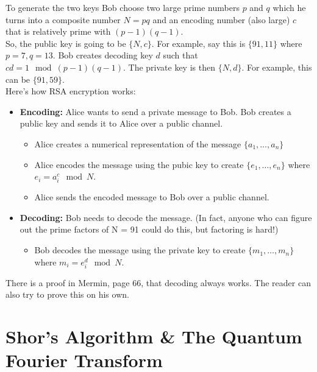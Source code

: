 \documentclass{book}
\theoremstyle{definition}
\begin{document}
To generate the two keys Bob choose two large prime numbers $p$
and $q$ which he turns into a composite number $N = pq$ and an
encoding number (also large) $c$ that is relatively prime with
$(p-1)(q-1)$. \\

So, the public key is going to be $\{ N,c\}$. For example, say this is $\{91,11\}$ where $p=7, q=13$. Bob creates  decoding key $d$ such that $cd = 1\mod (p-1)(q-1)$. The private key is then $\{N,d\}$. For example, this can be $\{91,59\}$. \\

Here's how RSA encryption works:
\begin{itemize}
	\item \textbf{Encoding:} Alice wants to send a private message to Bob. Bob creates a public key and sends it to Alice over a public channel.
	\begin{itemize}
		\item Alice creates a numerical representation of the message $\{a_1,\dots,a_n\}$
		\item Alice encodes the message using the pubic key to create $\{ e_1, \dots, e_n \}$ where $e_i = a_i^c \mod N$. 
		\item Alice sends the encoded message to Bob over a public channel. 
	\end{itemize}
	
	\item \textbf{Decoding:} Bob needs to decode the message. (In fact, anyone who can figure out the prime factors of N = 91 could do this, but factoring is hard!) 
	\begin{itemize}
		\item Bob decodes the message using the private key to create $\{m_1,\dots, m_n\}$ where $m_i = e_i^d\mod N$.  
	\end{itemize}
\end{itemize}  

There is a proof in Mermin, page 66, that decoding always works. The reader can also try to prove this on his own.














\newpage


\section{Shor's Algorithm \& The Quantum Fourier Transform}
\end{document}
